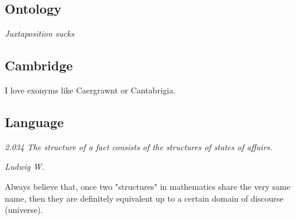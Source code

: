 \subsection{Ontology}
\epigraph{\footnotesize \textit{Juxtaposition sucks}}{}

\subsection{Cambridge}
I love exonyms like Caergrawnt or Cantabrigia. \\

\subsection{Language}
\epigraph{\footnotesize \textit{2.034 The structure of a fact consists of the structures of states of affairs.}}{\footnotesize \textit{Ludwig W.}}
Always believe that, once two "structures" in mathematics share the very same name, then they are definitely equivalent up to a certain domain of discourse (universe).